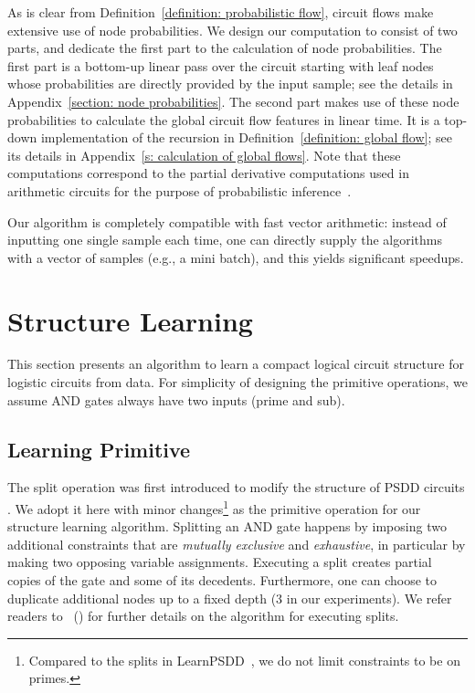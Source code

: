 \documentclass[letterpaper]{article} %
\newcommand{\citet}[1]{\citeauthor{#1}~(\citeyear{#1})}
\begin{document}
As is clear from Definition~\ref{definition: probabilistic flow}, circuit flows make extensive use of node probabilities.
We design our computation to consist of two parts, and dedicate the first part to the calculation of node probabilities. The first part is a bottom-up linear pass over the circuit starting with leaf nodes whose probabilities are directly provided by the input sample; see the details in Appendix~\ref{section: node probabilities}.
The second part makes use of these node probabilities to calculate the global circuit flow features in linear time. 
It is a top-down implementation of the recursion in Definition~\ref{definition: global flow}; see its details in Appendix~\ref{s: calculation of global flows}. 
Note that these computations correspond to the partial derivative computations used in arithmetic circuits for the purpose of probabilistic inference~\cite{DarwicheJACM}.

Our algorithm is completely compatible with fast vector arithmetic: instead of inputting one single sample each time,  one can directly supply the algorithms with a vector of samples (e.g., a mini batch), and this yields significant speedups. 


\section{Structure Learning} \label{s:structurelearning}
This section presents an algorithm to learn a compact logical circuit structure for logistic circuits from data. 
For simplicity of designing the primitive operations, we assume AND gates always have two inputs (prime and sub).

\subsection{Learning Primitive}
The split operation was first introduced to modify the structure of PSDD circuits \cite{Liang2017}. We adopt it here with minor changes\footnote{Compared to the splits in LearnPSDD~\cite{Liang2017}, we do not limit constraints to be on primes.} as the primitive operation for our structure learning algorithm. 
Splitting an AND gate happens by imposing two additional constraints that are \emph{mutually exclusive} and \emph{exhaustive}, in particular by making two opposing variable assignments.
Executing a split creates partial copies of the gate and some of its decedents. Furthermore, one can choose to duplicate additional nodes up to a fixed depth (3 in our experiments).
We refer readers to \citet{Liang2017} for further details on the algorithm for executing splits.
\end{document}
